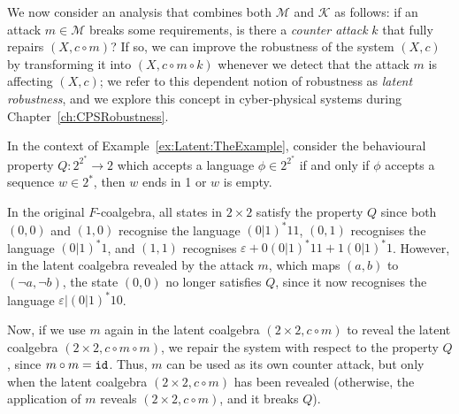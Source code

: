 We now consider an analysis that combines both $\mathcal{M}$ and $\mathcal{K}$ as follows: if an attack $m\in \mathcal{M}$ breaks some requirements, is there a \emph{counter attack} $k$ that fully repairs $(X,c\circ m)$? If so, we can improve the robustness of the system $(X,c)$ by transforming it into $(X,c\circ m \circ k)$ whenever we detect that the attack $m$ is affecting $(X,c)$; we refer to this dependent notion of robustness as \emph{latent robustness}, and we explore this concept in cyber-physical systems during Chapter~\ref{ch:CPSRobustness}.
\begin{example}
    In the context of Example~\ref{ex:Latent:TheExample}, consider the behavioural property $Q\colon 2^{2^*}\rightarrow 2$ which accepts a language $\phi \in 2^{2^*}$ if and only if $\phi$ accepts a sequence $w\in 2^*$, then $w$ ends in 1 or $w$ is empty.

    In the original $F$-coalgebra, all states in $2\times 2$ satisfy the property $Q$ since both $(0,0)$ and $(1,0)$ recognise the language $(0|1)^*11$, $(0,1)$ recognises the language $(0|1)^*1$, and $(1,1)$ recognises $\varepsilon + 0(0|1)^*11 + 1(0|1)^*1$. However, in the latent coalgebra revealed by the attack $m$, which maps $(a,b)$ to $(\lnot a, \lnot b)$, the state $(0,0)$ no longer satisfies $Q$, since it now recognises the language $\varepsilon|(0|1)^*10$. 

    Now, if we use $m$ again in the latent coalgebra $(2\times 2, c\circ m)$ to reveal the latent coalgebra $(2\times 2, c\circ m\circ m)$, we repair the system with respect to the property $Q$, since $m \circ m={\texttt{id}}$. Thus, $m$ can be used as its own counter attack, but only when the latent coalgebra $(2\times 2, c\circ m)$ has been revealed (otherwise, the application of $m$ reveals $(2\times 2, c\circ m)$, and it breaks $Q$).
\end{example}




